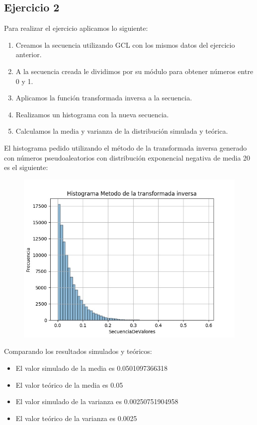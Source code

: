 \documentclass[11pt,a4paper]{article}
\begin{document}
	\subsection{Ejercicio 2}
	    Para realizar el ejercicio aplicamos lo siguiente:
	    \begin{enumerate}
	        \item Creamos la secuencia utilizando GCL con los mismos datos del ejercicio anterior.
	        \item A la secuencia creada le dividimos por su módulo para obtener números entre 0 y 1.
	        \item Aplicamos la función transformada inversa a la secuencia.
	        \item Realizamos un histograma con la nueva secuencia.
	        \item Calculamos la media y varianza de la distribución simulada y teórica.
	    \end{enumerate}
	    
		El histograma pedido utilizando el método de la transformada inversa generado con números pseudoaleatorios con distribución exponencial negativa de media 20 es el siguiente:
		\begin{figure}[H]
  			\centering
    			\includegraphics[width=12cm]{imagenes/histogramaEjer2}
		\end{figure}
		Comparando los resultados simulados y teóricos:
		\begin{itemize}
			\item El valor simulado de la media es 0.0501097366318
			\item El valor teórico de la media es 0.05
			\item El valor simulado de la varianza es 0.00250751904958
			\item El valor teórico de la varianza es 0.0025
		\end{itemize}
		
\end{document}
